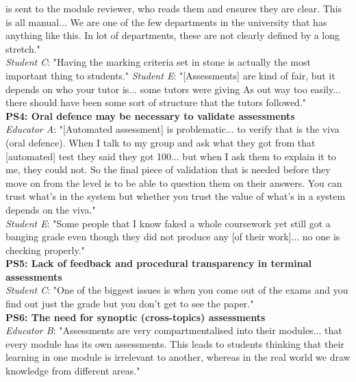 is sent to the module reviewer, who reads them and ensures they are clear. This is all manual... 
We are one of the few departments in the university that has anything like this. In lot of departments, 
these are not clearly defined by a long stretch."\\
\textit{Student C}: "Having the marking criteria set in stone is actually the most important thing 
to students."
\textit{Student E}: "[Assessments] are kind of fair, but it depends on who your tutor is... 
some tutors were giving As out way too easily... there should have been some sort of structure that 
the tutors followed."
\vspace{0.25cm}\\
\textbf{PS4: Oral defence may be necessary to validate assessments}\\
\textit{Educator A}: "[Automated assessment] is problematic... to verify that is the viva (oral defence).
When I talk to my group and ask what they got from that [automated] test they said they got 100... 
but when I ask them to explain it to me, they could not. So the final piece of validation that is needed
before they move on from the level is to be able to question them on their answers. You can trust 
what's in the system but whether you trust the value of what's in a system depends on the viva."\\
\textit{Student E}: "Some people that I know faked a whole coursework yet still got a banging grade 
even though they did not produce any [of their work]... no one is checking properly."
\vspace{0.25cm}\\
\textbf{PS5: Lack of feedback and procedural transparency in terminal assessments}\\
\textit{Student C}: "One of the biggest issues is when you come out of the exams and you find out 
just the grade but you don't get to see the paper."
\vspace{0.25cm}\\
\textbf{PS6: The need for synoptic (cross-topics) assessments}\\
\textit{Educator B}: "Assessments are very compartmentalised into their modules... that every module has 
its own assessments. This leads to students thinking that their learning in one module is irrelevant 
to another, whereas in the real world we draw knowledge from different areas."

